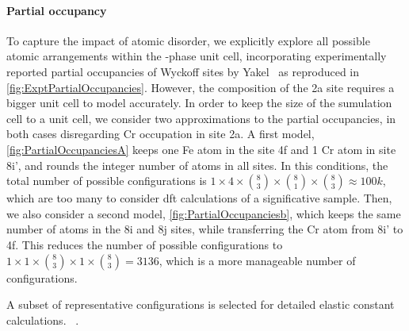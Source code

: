 \documentclass[superscriptaddress, 12pt]{revtex4-2}%
\begin{document}
\paragraph{Partial occupancy} To capture the impact of atomic disorder, we explicitly explore all possible atomic arrangements within the
\textsigma-phase unit cell, incorporating experimentally reported partial occupancies of Wyckoff sites by
Yakel~\cite{yakel_atom_1983} as reproduced in \autoref{fig:ExptPartialOccupancies}. However, the composition of the 2a
site requires a bigger unit cell to model accurately. 
In order to keep the size of the sumulation cell to a unit cell, we consider two approximations to the partial
occupancies, in both cases disregarding Cr occupation in site 2a.
A first model, \autoref{fig:PartialOccupanciesA} keeps one Fe atom in the site 4f and 1 Cr atom in site 8i', and rounds
the integer number of atoms in all sites. In this conditions, the total number of possible configurations is
$ 1 \times 4 \times \binom{8}{3}\times \binom{8}{1} \times \binom {8}{3} \approx 100k $, which are too many to consider
dft calculations of a significative sample. Then, we also consider a second model, \autoref{fig:PartialOccupanciesb},
which keeps the same number of atoms in the 8i and 8j sites, while transferring the Cr atom from 8i' to 4f. This reduces
the number of possible configurations to $ 1 \times 1 \times \binom{8}{3}\times 1 \times \binom {8}{3}
= 3136 $, which is a more manageable number of configurations.

A subset of representative configurations is selected for detailed elastic constant
calculations. ~\cite{golesorkhtabar_elastic_2013}.
\end{document}
